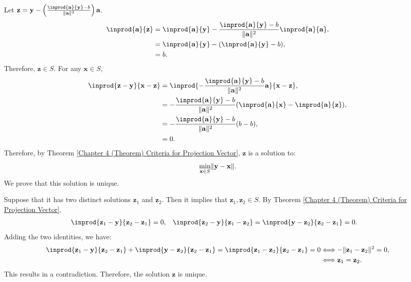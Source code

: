 \documentclass{huhtakm-template-book-v2}
\begin{document}
    \begin{proofing}
        Let $\mathbf{z} = \mathbf{y} - \left(\frac{\inprod{\mathbf{a}}{\mathbf{y}}-b}{\norm{\mathbf{a}}^{2}}\right)\mathbf{a}$.
        \begin{align*}
            \inprod{\mathbf{a}}{\mathbf{z}} &= \inprod{\mathbf{a}}{\mathbf{y}} - \frac{\inprod{\mathbf{a}}{\mathbf{y}}-b}{\norm{\mathbf{a}}^{2}}\inprod{\mathbf{a}}{\mathbf{a}},\\
            &= \inprod{\mathbf{a}}{\mathbf{y}} - (\inprod{\mathbf{a}}{\mathbf{y}} - b),\\
            &= b.
        \end{align*}
        Therefore, $\mathbf{z} \in S$. For any $\mathbf{x} \in S$,
        \begin{align*}
            \inprod{\mathbf{z}-\mathbf{y}}{\mathbf{x}-\mathbf{z}} &= \inprod{-\frac{\inprod{\mathbf{a}}{\mathbf{y}}-b}{\norm{\mathbf{a}}^{2}}\mathbf{a}}{\mathbf{x}-\mathbf{z}},\\
            &= -\frac{\inprod{\mathbf{a}}{\mathbf{y}}-b}{\norm{\mathbf{a}}^{2}}(\inprod{\mathbf{a}}{\mathbf{x}} - \inprod{\mathbf{a}}{\mathbf{z}}),\\
            &= -\frac{\inprod{\mathbf{a}}{\mathbf{y}}-b}{\norm{\mathbf{a}}^{2}}(b-b),\\
            &= 0.
        \end{align*}
        Therefore, by Theorem \ref{Chapter 4 (Theorem) Criteria for Projection Vector}, $\mathbf{z}$ is a solution to:
        \begin{equation*}
            \min_{\mathbf{x} \in S}\lVert{\mathbf{y}-\mathbf{x}}\rVert.
        \end{equation*}
        We prove that this solution is unique.
        
        Suppose that it has two distinct solutions $\mathbf{z}_{1}$ and $\mathbf{z}_{2}$. Then it implies that $\mathbf{z}_{1}, \mathbf{z}_{2} \in S$. By Theorem \ref{Chapter 4 (Theorem) Criteria for Projection Vector},
        \begin{align*}
            \inprod{\mathbf{z}_{1}-\mathbf{y}}{\mathbf{z}_{2}-\mathbf{z}_{1}} &= 0, & \inprod{\mathbf{z}_{2}-\mathbf{y}}{\mathbf{z}_{1}-\mathbf{z}_{2}} &= \inprod{\mathbf{y}-\mathbf{z}_{2}}{\mathbf{z}_{2}-\mathbf{z}_{1}} = 0.
        \end{align*}
        Adding the two identities, we have:
        \begin{align*}
            \inprod{\mathbf{z}_{1}-\mathbf{y}}{\mathbf{z}_{2}-\mathbf{z}_{1}} + \inprod{\mathbf{y}-\mathbf{z}_{2}}{\mathbf{z}_{2}-\mathbf{z}_{1}} = \inprod{\mathbf{z}_{1}-\mathbf{z}_{2}}{\mathbf{z}_{2}-\mathbf{z}_{1}} = 0 &\Longleftrightarrow -\norm{\mathbf{z}_{1}-\mathbf{z}_{2}}^{2} = 0,\\
            &\Longleftrightarrow \mathbf{z}_{1} = \mathbf{z}_{2}.
        \end{align*}
        This results in a contradiction. Therefore, the solution $\mathbf{z}$ is unique.
    \end{proofing}
\end{document}
